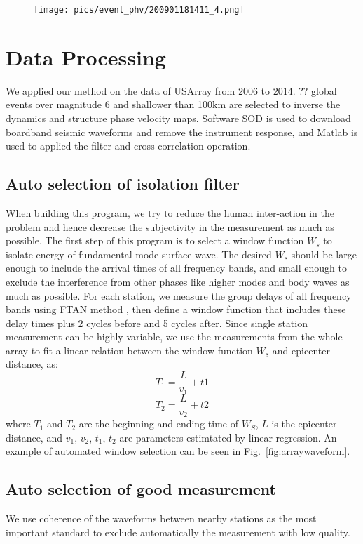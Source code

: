 \documentclass{gji}
\begin{document}
\begin{figure}
	\texttt{[image: pics/event\_phv/200901181411\_4.png]}
	\caption{}
	\label{fig:eventfig}
\end{figure}

\section{Data Processing}
We applied our method on the data of USArray from 2006 to 2014. ?? global events over magnitude 6 and shallower than 100km are selected to inverse the dynamics and structure phase velocity maps. Software SOD \cite{Owens:2004sod} is used to download boardband seismic waveforms and remove the instrument response, and Matlab is used to applied the filter and cross-correlation operation.

\subsection{Auto selection of isolation filter}
When building this program, we try to reduce the human inter-action in the problem and hence decrease the subjectivity in the measurement as much as possible. 
The first step of this program is to select a window function $W_s$ to isolate energy of fundamental mode surface wave. The desired $W_s$ should be large enough to include the arrival times of all frequency bands, and small enough to exclude the interference from other phases like higher modes and body waves as much as possible. For each station, we measure the group delays of all frequency bands using FTAN method \cite{Levshin:1992ve}, then define a window function that includes these delay times plus 2 cycles before and 5 cycles after. Since single station measurement can be highly variable, we use the measurements from the whole array to fit a linear relation between the window function $W_s$ and epicenter distance, as:
\[
T_1 = \frac{L}{v_1} + t1
\]
\[
T_2 = \frac{L}{v_2} + t2
\]
where $T_1$ and $T_2$ are the beginning and ending time of $W_S$, $L$ is the epicenter distance, and $v_1$, $v_2$, $t_1$, $t_2$ are parameters estimtated by linear regression.
An example of automated window selection can be seen in Fig.~\ref{fig:arraywaveform}.

\subsection{Auto selection of good measurement}
We use coherence of the waveforms between nearby stations as the most important standard to exclude automatically the measurement with low quality. 
\end{document}
